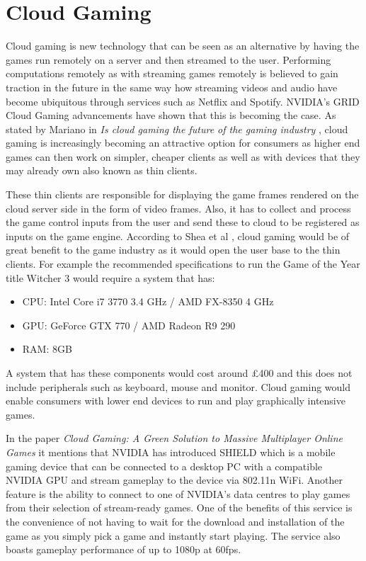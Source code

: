 \section{Cloud Gaming}
Cloud gaming is new technology that can be seen as an alternative by having the games run remotely on a server and then streamed to the user. Performing computations remotely as with streaming games remotely is believed to gain traction in the future in the same way how streaming videos and audio have become ubiquitous through services such as Netflix and Spotify. NVIDIA's GRID Cloud Gaming advancements have shown that this is becoming the case. As stated by Mariano in \textit{Is cloud gaming the future of the gaming industry} \cite{mariano2015cloud}, cloud gaming is increasingly becoming an attractive option for consumers as higher end games can then work on simpler, cheaper clients as well as with devices that they may already own also known as thin clients.
\newline
\par
These thin clients are responsible for displaying the game frames rendered on the cloud server side in the form of video frames. Also, it has to collect and process the game control inputs from the user and send these to cloud to be registered as inputs on the game engine. According to Shea et al \cite{shea2013cloud}, cloud gaming would be of great benefit to the game industry as it would open the user base to the thin clients. For example the recommended specifications to run the Game of the Year title Witcher 3 would require a system that has:
\begin{itemize}
 \item CPU: Intel Core i7 3770 3.4 GHz / AMD FX-8350 4 GHz
 \item GPU: GeForce GTX 770 / AMD Radeon R9 290
 \item RAM: 8GB
\end{itemize}
A system that has these components would cost around £400 and this does not include peripherals such as keyboard, mouse and monitor. Cloud gaming would enable consumers with lower end devices to run and play graphically intensive games.
\newline
\par
In the paper \textit{Cloud Gaming: A Green Solution to Massive Multiplayer Online Games} \cite{chuah2014cloud} it mentions that NVIDIA has introduced SHIELD which is a mobile gaming device that can be connected to a desktop PC with a compatible NVIDIA GPU and stream gameplay to the device via 802.11n WiFi. Another feature is the ability to connect to one of NVIDIA's data centres to play games from their selection of stream-ready games. One of the benefits of this service is the convenience of not having to wait for the download and installation of the game as you simply pick a game and instantly start playing. The service also boasts gameplay performance of up to 1080p at 60fps.
\newline
\par

